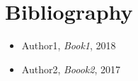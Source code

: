 \chapter*{Bibliography} 

\begin{itemize}
    \item Author1, \textit{Book1}, 2018
    \item Author2, \textit{Boook2}, 2017
\end{itemize}